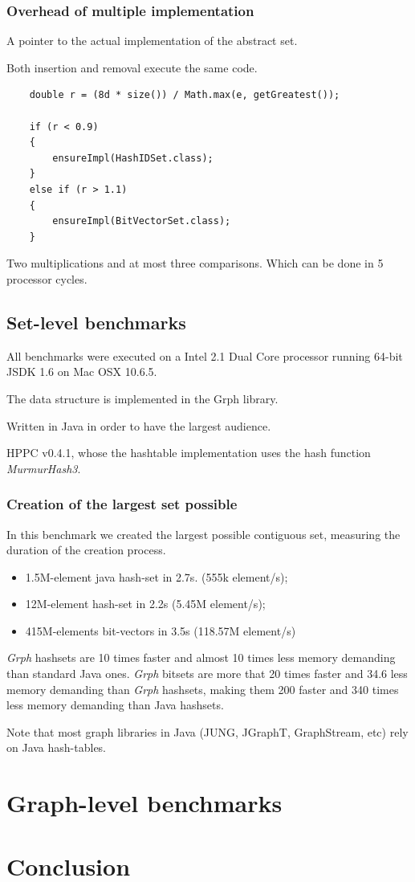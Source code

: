 \documentclass{article}
\newcommand{\grph}{\textsl{Grph}\xspace}
\begin{document}
\subsubsection{Overhead of multiple implementation}

A pointer to the actual implementation of the abstract set.

Both insertion and removal execute the same code.
\begin{lstlisting}
	double r = (8d * size()) / Math.max(e, getGreatest());
	
	if (r < 0.9)
	{
	    ensureImpl(HashIDSet.class);
	}
	else if (r > 1.1)
	{
	    ensureImpl(BitVectorSet.class);
	}
\end{lstlisting}

Two multiplications and at most three comparisons. Which can be done in 5 processor cycles.



\subsection{Set-level benchmarks}

All benchmarks were executed on a Intel 2.1 Dual Core processor running 64-bit JSDK 1.6 on Mac OSX 10.6.5.

The data structure is implemented in the Grph library.

Written in Java in order to have the largest audience.

HPPC v0.4.1, whose the hashtable implementation uses the hash function
\textit{MurmurHash3}.


\subsubsection{Creation of the largest set possible}

In this benchmark we created the largest possible contiguous set, measuring the duration of the creation process. 
\begin{itemize}
  \item 1.5M-element java hash-set in 2.7s. (555k element/s);
  \item 12M-element hash-set in 2.2s (5.45M element/s);
  \item 415M-elements bit-vectors in 3.5s (118.57M element/s)
\end{itemize}


\grph hashsets are 10 times faster and almost 10 times less memory demanding than standard Java ones.
\grph bitsets are more that 20 times faster and 34.6 less memory demanding than \grph hashsets, making them 
200 faster and 340 times less memory demanding than Java hashsets.



Note that most graph libraries in Java (JUNG, JGraphT, GraphStream, etc) rely on Java hash-tables.


\section{Graph-level benchmarks}



\section{Conclusion}
\end{document}
